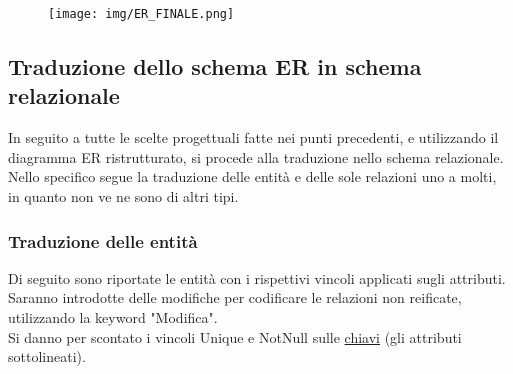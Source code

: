 \documentclass{article}
\begin{document}
\begin{figure}[h]
    \centering
    \texttt{[image: img/ER\_FINALE.png]}
    \label{fig:ER_Schema2}
\end{figure}

\subsection{Traduzione dello schema ER in schema relazionale}

In seguito a tutte le scelte progettuali fatte nei punti precedenti, e utilizzando il diagramma ER ristrutturato, si procede alla traduzione nello schema relazionale.
Nello specifico segue la traduzione delle entità e delle sole relazioni uno a molti, in quanto non ve ne sono di altri tipi.

\subsubsection{Traduzione delle entità}
Di seguito sono riportate le entità con i rispettivi vincoli applicati sugli attributi. 
Saranno introdotte delle modifiche per codificare le relazioni non reificate, utilizzando la keyword "Modifica". 
\\Si danno per scontato i vincoli Unique e NotNull sulle \underline{chiavi} (gli attributi sottolineati).
\end{document}
